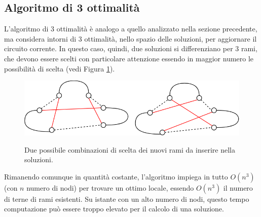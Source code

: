 \subsection{Algoritmo di 3 ottimalità}
L'algoritmo di 3 ottimalità è analogo a quello analizzato nella sezione precedente, ma considera intorni di 3 ottimalità, nello spazio delle soluzioni, per aggiornare il circuito corrente. In questo caso, quindi, due soluzioni si differenziano per 3 rami, che devono essere scelti con particolare attenzione essendo in maggior numero le possibilità di scelta (vedi Figura \ref{three_optimality}).
\begin{figure}[h] 
\begin{center} 
  \includegraphics[scale=0.4]{Images/three_exchange}\\ 
  \caption{\footnotesize{Due possibile combinazioni di scelta dei nuovi rami da inserire nella soluzioni.}}
  \label{three_optimality}
\end{center}
\end{figure}
Rimanendo comunque in quantità costante, l'algoritmo impiega in tutto $O(n^3)$ (con $n$ numero di nodi) per trovare un ottimo locale, essendo $O(n^3)$ il numero di terne di rami esistenti. Su istante con un alto numero di nodi, questo tempo computazione può essere troppo elevato per il calcolo di una soluzione. 
